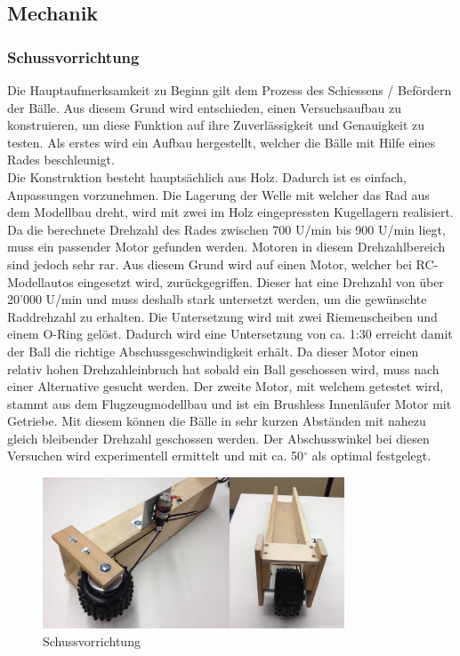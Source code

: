 \subsection{Mechanik}

\subsubsection{Schussvorrichtung}
\label{sec:test_shot}
Die Hauptaufmerksamkeit zu Beginn gilt dem Prozess des Schiessens / Befördern 
der Bälle. Aus diesem Grund wird entschieden, einen Versuchsaufbau zu 
konstruieren, um diese Funktion auf ihre Zuverlässigkeit und Genauigkeit zu 
testen. Als erstes wird ein Aufbau hergestellt, welcher die Bälle mit Hilfe 
eines Rades beschleunigt. \\
%
Die Konstruktion besteht hauptsächlich aus Holz. Dadurch ist es einfach, Anpassungen 
vorzunehmen. Die Lagerung der Welle mit welcher das 
Rad aus dem Modellbau dreht, wird mit zwei im Holz eingepressten Kugellagern 
realisiert. Da die berechnete Drehzahl des Rades zwischen 700 U/min bis 900 
U/min liegt, muss ein passender Motor gefunden werden. Motoren in diesem 
Drehzahlbereich sind jedoch sehr rar. Aus diesem Grund wird auf einen Motor, 
welcher bei RC-Modellautos eingesetzt wird, zurückgegriffen. Dieser hat 
eine Drehzahl von über 20'000 U/min und muss deshalb stark untersetzt werden, 
um die gewünschte Raddrehzahl zu erhalten. Die Untersetzung wird mit zwei 
Riemenscheiben und einem O-Ring gelöst. Dadurch wird eine Untersetzung von 
ca. 1:30 erreicht damit der Ball die richtige Abschussgeschwindigkeit erhält. 
Da dieser Motor einen relativ hohen Drehzahleinbruch hat sobald ein 
Ball geschossen wird, muss nach einer Alternative gesucht werden. Der 
zweite Motor, mit welchem getestet wird, stammt aus dem Flugzeugmodellbau und 
ist ein Brushless Innenläufer Motor mit Getriebe. Mit diesem können die 
Bälle in sehr kurzen Abständen mit nahezu gleich bleibender Drehzahl geschossen 
werden. Der Abschusswinkel bei diesen Versuchen wird experimentell ermittelt 
und mit ca. 50$^\circ$ als optimal festgelegt. \\
\begin{figure}[h!]          
	\centering             
	\includegraphics[width=0.8\textwidth]{fig/Schussvorrichtung.png}    
	\caption{Schussvorrichtung}
	
	\label{fig:Schussvorrichtung}
\end{figure}
